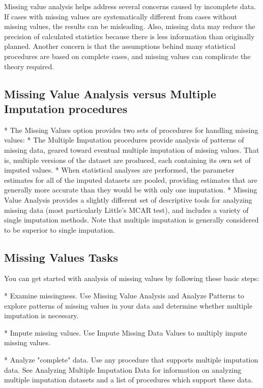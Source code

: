 Missing value analysis helps address several concerns caused by incomplete data. If cases with
missing values are systematically different from cases without missing values, the results can be
misleading. Also, missing data may reduce the precision of calculated statistics because there
is less information than originally planned. Another concern is that the assumptions behind
many statistical procedures are based on complete cases, and missing values can complicate
the theory required.



\subsection{Missing Value Analysis versus Multiple Imputation procedures}

*  The Missing Values option provides two sets of procedures for handling missing values:
*  The Multiple Imputation procedures provide analysis of patterns of missing data, geared toward eventual multiple imputation of missing values. That is, multiple versions of the dataset are produced, each containing its own set of imputed values. *  When statistical analyses are performed, the parameter estimates for all of the imputed datasets are pooled, providing estimates that are generally more accurate than they would be with only one imputation.
* 
Missing Value Analysis provides a slightly different set of descriptive tools for analyzing missing data (most particularly Little's MCAR test), and includes a variety of single imputation methods. Note that multiple imputation is generally considered to be superior to single imputation.



\subsection{Missing Values Tasks}

You can get started with analysis of missing values by following these basic steps:

\begin{enumerate}
*   Examine missingness. Use Missing Value Analysis and Analyze Patterns to explore patterns of missing values in your data and determine whether multiple imputation is necessary.

*  Impute missing values. Use Impute Missing Data Values to multiply impute missing values.

*  Analyze "complete" data. Use any procedure that supports multiple imputation data. See Analyzing Multiple Imputation Data for information on analyzing multiple imputation datasets and a list of procedures which support these data.
\end{enumerate}

